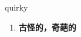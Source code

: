 
\begin{frame}
{\huge quirky}
\begin{center}
\begin{enumerate}\Large
  \item \textbf{古怪的，奇葩的}
\end{enumerate}
\end{center}
\end{frame}
